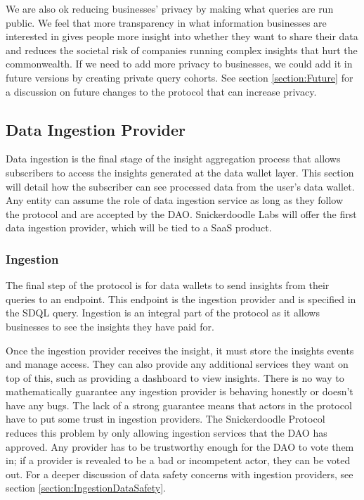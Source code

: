 We are also ok reducing businesses' privacy by making what queries are run public. We feel that more transparency in what information businesses are interested 
in gives people more insight into whether they want to share their data and reduces the societal risk of companies running complex insights that hurt the 
commonwealth. If we need to add more privacy to businesses, we could add it in future versions by creating private query cohorts. See section \ref{section:Future} 
for a discussion on future changes to the protocol that can increase privacy.

\subsection{Data Ingestion Provider} %

Data ingestion is the final stage of the insight aggregation process that allows subscribers to access the insights generated at the data wallet layer. 
This section will detail how the subscriber can see processed data from the user's data wallet. Any entity can assume the role of data ingestion service 
as long as they follow the protocol and are accepted by the DAO. Snickerdoodle Labs will offer the first data ingestion provider, which will be tied to 
a SaaS product. 

\subsubsection{Ingestion}
The final step of the protocol is for data wallets to send insights from their queries to an endpoint. This endpoint is the ingestion provider and is 
specified in the SDQL query. Ingestion is an integral part of the protocol as it allows businesses to see the insights they have paid for.

Once the ingestion provider receives the insight, it must store the insights events and manage access. They can also provide any additional services 
they want on top of this, such as providing a dashboard to view insights. There is no way to mathematically guarantee any ingestion provider is behaving 
honestly or doesn't have any bugs. The lack of a strong guarantee means that actors in the protocol have to put some trust in ingestion providers. The 
Snickerdoodle Protocol reduces this problem by only allowing ingestion services that the DAO has approved. Any provider has to be trustworthy enough for 
the DAO to vote them in; if a provider is revealed to be a bad or incompetent actor, they can be voted out. For a deeper discussion of data safety 
concerns with ingestion providers, see section \ref{section:IngestionDataSafety}.

